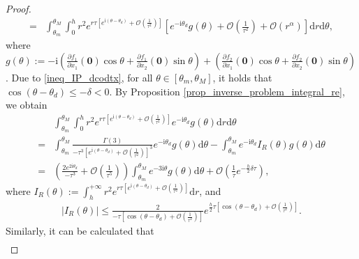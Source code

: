 \documentclass[11pt,reqno,oneside]{amsart}
\theoremstyle{definition}
\theoremstyle{remark}
\numberwithin{equation}{section}
\numberwithin{equation}{section}
\theoremstyle{remark}
\begin{document}
\begin{proof}
\begin{align}
		= & \int_{\theta_m}^{\theta_M} \int_{0}^{h} r^2 e^{r \tau\left[e^{\mathrm{i}\left(\theta-\theta_d\right)} + \mathcal{O}\left(\frac{1}{\tau^2}\right)\right]}\left[e^{-\mathrm{i}\theta_d}g\left(\theta\right) + \mathcal{O}\left(\frac{1}{\tau^2}\right) + \mathcal{O}\left(r^{\alpha}\right)\right] \mathrm{d}r \mathrm{d}\theta ,
	\end{align}
	where $ g\left(\theta\right) := -\text{i}\left(\frac{\partial f_1}{\partial x_1}\left(\bm{0}\right)\cos\theta + \frac{\partial f_1}{\partial x_2}\left(\bm{0}\right)\sin\theta\right) + \left(\frac{\partial f_2}{\partial x_1}\left(\bm{0}\right)\cos\theta + \frac{\partial f_2}{\partial x_2}\left(\bm{0}\right)\sin\theta\right) $. Due to \eqref{ineq_IP_dcodtx}, for all $ \theta\in\left[\theta_m, \theta_M\right] $, it holds that $ \cos \left(\theta-\theta_d\right) \leqslant -\delta < 0 $. By Proposition \ref{prop_inverse_problem_integral_re}, we obtain
	\begin{align*}
		& \int_{\theta_m}^{\theta_M} \int_{0}^{h} r^2 e^{r \tau\left[e^{\mathrm{i}\left(\theta-\theta_d\right)} + \mathcal{O}\left(\frac{1}{\tau^2}\right)\right]} e^{-\mathrm{i}\theta_d}g\left(\theta\right) \mathrm{d}r \mathrm{d}\theta \\
		= & \int_{\theta_m}^{\theta_M} \frac{\Gamma\left(3\right) }{-\tau^3\left[e^{\text{i}\left(\theta-\theta_d\right)} + \mathcal{O} \left(\frac{1}{\tau^2}\right)\right]^3} e^{-\text{i}\theta_d}g\left(\theta\right) \mathrm{d}\theta - \int_{\theta_m}^{\theta_M} e^{-\text{i}\theta_d} I_R\left(\theta\right) g\left(\theta\right) \mathrm{d}\theta \\
		= & \left(\frac{2e^{2\text{i}\theta_d}}{-\tau^3} + \mathcal{O} \left(\frac{1}{\tau^5}\right)\right)  \int_{\theta_m}^{\theta_M} e^{-3\text{i}\theta} g\left(\theta\right) \mathrm{d}\theta + \mathcal{O} \left( \frac{1}{\tau} e^{-\frac{h}{2}\delta\tau} \right) ,
	\end{align*}
	where $ I_R\left(\theta\right) := \int_{h}^{+\infty} r^2 e^{r \tau\left[e^{\mathrm{i}\left(\theta-\theta_d\right)} + \mathcal{O}\left(\frac{1}{\tau^2}\right)\right]} \mathrm{d}r $, and 
	\begin{align*}
		\left| I_R\left(\theta\right) \right| \leqslant \frac{2}{-\tau\left[\cos\left(\theta-\theta_d\right) + \mathcal{O}\left(\frac{1}{\tau^2}\right)\right]}e^{\frac{h}{2}\tau\left[\cos\left(\theta-\theta_d\right) + \mathcal{O}\left(\frac{1}{\tau^2}\right)\right]} .
	\end{align*}
	Similarly, it can be calculated that
	\begin{align*}

\end{align*}
\end{proof}
\end{document}
